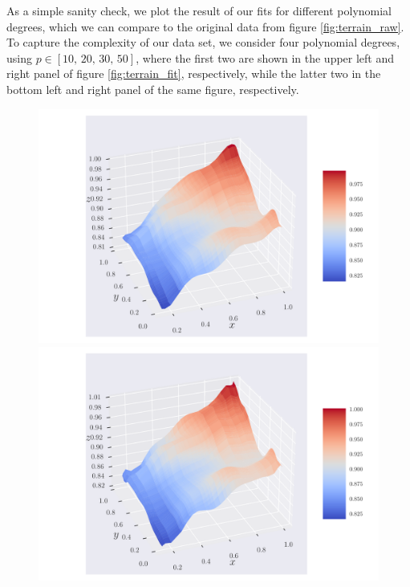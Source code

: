 \documentclass[reprint,english,notitlepage,aps,nobalancelastpage,nofootinbib]{revtex4-1}  %
\begin{document}
As a simple sanity check, we plot the result of our fits for different polynomial degrees, which we can compare to the original data from figure \ref{fig:terrain_raw}. To capture the complexity of our data set, we consider four polynomial degrees, using $p\in[10,\,20,\,30,\,50]$, where the first two are shown in the upper left and right panel of figure \ref{fig:terrain_fit}, respectively, while the latter two in the bottom left and right panel of the same figure, respectively.

\begin{figure}[h]
	\includegraphics[width=\linewidth]{SRTM_prediction_p10.pdf}
	\endminipage\hfill
	\includegraphics[width=\linewidth]{SRTM_prediction_p20.pdf}
	\endminipage\hfill

\end{figure}
\end{document}
